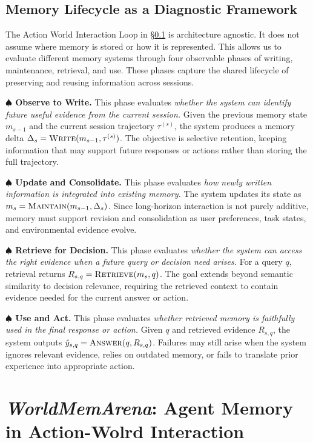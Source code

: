 \documentclass{article}
\begin{document}
\subsection{Memory Lifecycle as a Diagnostic Framework}
\label{sec:problem-lifecycle}
The Action World Interaction Loop in \S\ref{sec:problem-lifecycle} is architecture agnostic. It does not assume where memory is stored or how it is represented. This allows us to evaluate different memory systems through four observable phases of writing, maintenance, retrieval, and use. These phases capture the shared lifecycle of preserving and reusing information across sessions.

\textbf{$\spadesuit$ Observe to Write.} This phase evaluates  \textit{whether the system can identify future useful evidence
from the current session.} Given the previous memory state $m_{s-1}$ and the
current session trajectory $\tau^{(s)}$, the system produces a memory delta
$\Delta_s=\textsc{Write}(m_{s-1},\tau^{(s)})$. The objective is selective
retention, keeping information that may support future responses or actions
rather than storing the full trajectory.

\textbf{$\spadesuit$ Update and Consolidate.} This phase evaluates \textit{how newly written information is integrated into
existing memory.} The system updates its state as
$m_s=\textsc{Maintain}(m_{s-1},\Delta_s)$.  Since long-horizon interaction is
not purely additive, memory must support revision and consolidation as user
preferences, task states, and environmental evidence evolve.

\textbf{$\spadesuit$ Retrieve for Decision.} This phase evaluates \textit{whether the system can access the right evidence when a
future query or decision need arises.} For a query $q$, retrieval returns
$R_{s,q}=\textsc{Retrieve}(m_s,q)$. The goal extends beyond semantic similarity to decision relevance, requiring the retrieved context to contain evidence needed for the current answer or action.

\textbf{$\spadesuit$ Use and Act.} This phase evaluates \textit{whether retrieved memory is faithfully used in the final
response or action.} Given $q$ and retrieved evidence $R_{s,q}$, the system
outputs $\hat{y}_{s,q}=\textsc{Answer}(q,R_{s,q})$. Failures may still arise
when the system ignores relevant evidence, relies on outdated memory, or fails
to translate prior experience into appropriate action.




\section{\textit{WorldMemArena}: Agent Memory in Action-Wolrd Interaction}
\label{sec:benchmark}
\end{document}
